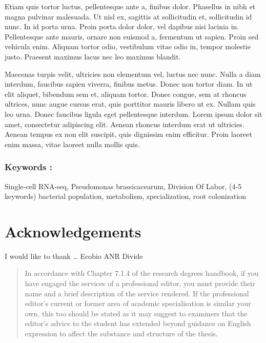 \documentclass[
  11pt,
  a4paper,
]{report}
\begin{document}
Etiam quis tortor luctus, pellentesque ante a, finibus dolor. Phasellus
in nibh et magna pulvinar malesuada. Ut nisl ex, sagittis at
sollicitudin et, sollicitudin id nunc. In id porta urna. Proin porta
dolor dolor, vel dapibus nisi lacinia in. Pellentesque ante mauris,
ornare non euismod a, fermentum ut sapien. Proin sed vehicula enim.
Aliquam tortor odio, vestibulum vitae odio in, tempor molestie justo.
Praesent maximus lacus nec leo maximus blandit.

Maecenas turpis velit, ultricies non elementum vel, luctus nec nunc.
Nulla a diam interdum, faucibus sapien viverra, finibus metus. Donec non
tortor diam. In ut elit aliquet, bibendum sem et, aliquam tortor. Donec
congue, sem at rhoncus ultrices, nunc augue cursus erat, quis porttitor
mauris libero ut ex. Nullam quis leo urna. Donec faucibus ligula eget
pellentesque interdum. Lorem ipsum dolor sit amet, consectetur
adipiscing elit. Aenean rhoncus interdum erat ut ultricies. Aenean
tempus ex non elit suscipit, quis dignissim enim efficitur. Proin
laoreet enim massa, vitae laoreet nulla mollis quis.

\subsection*{Keywords :}\label{keywords}

Single-cell RNA-seq, Pseudomonas brassicacearum, Division Of Labor, (4-5
keywords) bacterial population, metabolism, specialization, root
colonization


\chapter*{Acknowledgements}\label{acknowledgements}


I would like to thank \ldots{} Ecobio ANR Divide

\begin{quote}
In accordance with Chapter 7.1.4 of the research degrees handbook, if
you have engaged the services of a professional editor, you must provide
their name and a brief description of the service rendered. If the
professional editor's current or former area of academic specialisation
is similar your own, this too should be stated as it may suggest to
examiners that the editor's advice to the student has extended beyond
guidance on English expression to affect the substance and structure of
the thesis.
\end{quote}
\end{document}
